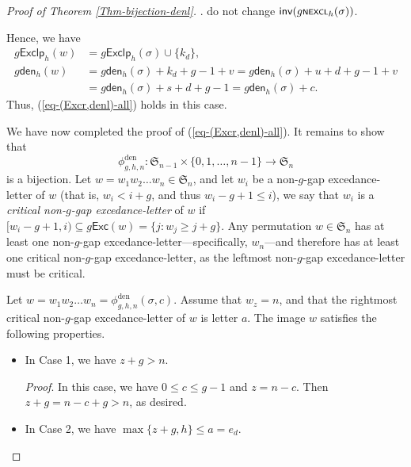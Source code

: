 \documentclass[12pt]{article}
\begin{document}
\begin{proof}[Proof of Theorem \ref{Thm-bijection-denl}]
. do not change $\textsf{inv}(g\textsf{\scriptsize{NEXCL}}_{h}(\sigma))$.

\noindent Hence, we have
\begin{align*}
	g\textsf{Exclp}_{h}(w)&=g\textsf{Exclp}_{h}(\sigma)\cup\{k_{d}\},\\
	g\textsf{den}_{h}(w)&=g\textsf{den}_{h}(\sigma)+k_{d}+g-1+v=g\textsf{den}_{h}(\sigma)+u+d+g-1+v\\
	~\quad\quad\quad~&=g\textsf{den}_{h}(\sigma)+s+d+g-1=g\textsf{den}_{h}(\sigma)+c.
\end{align*}
Thus, (\ref{eq-(Excr,denl)-all}) holds in this case.

We have now completed the proof of  (\ref{eq-(Excr,denl)-all}).
It remains to show that 
$$\phi_{g,h,n}^{\text{den}}: \mathfrak{S}_{n-1}\times\{0,1,\ldots,n-1\}\rightarrow\mathfrak{S}_{n}
$$
is a bijection.
Let $w=w_{1}w_{2}\ldots w_{n}\in\mathfrak{S}_{n}$,
and let $w_{i}$ be a non-$g$-gap excedance-letter of $w$ 
(that is, $w_{i}<i+g$, and thus $w_{i}-g+1\leq i$),
we say that $w_{i}$ is a \emph{critical non-$g$-gap excedance-letter} of $w$ 
if $[w_{i}-g+1,i)\subseteq g\textsf{Exc}(w)=\{j:w_{j}\geq j+g\}$.
Any permutation $w\in\mathfrak{S}_{n}$ has at least one non-$g$-gap excedance-letter---specifically, $w_{n}$---and therefore has at least one critical non-$g$-gap excedance-letter, 
as the leftmost non-$g$-gap excedance-letter must be critical.

Let $w=w_{1}w_{2}\ldots w_{n}=\phi_{g,h,n}^{\text{den}}(\sigma,c)$.
Assume that $w_{z}=n$, and that the rightmost critical non-$g$-gap excedance-letter of $w$ is letter $a$.
The image $w$ satisfies the following properties.
\begin{itemize}
	\item[$\bullet$] In Case 1, we have $z+g> n$. 
	
	\emph{Proof}. In this case, we have $0\leq c\leq g-1$ and $z=n-c$. Then $z+g=n-c+g>n$, as desired.
	
	\item[$\bullet$] In Case 2, we have $\max\{z+g,h\}\leq a=e_{d}$.
	

\end{itemize}
\end{proof}
\end{document}
